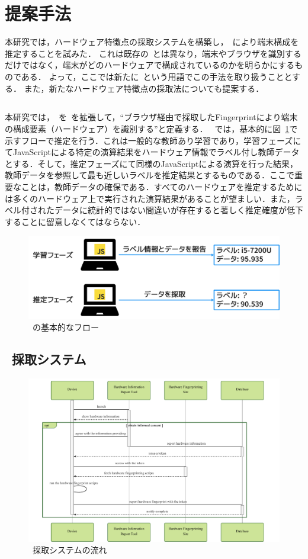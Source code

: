 \newpage
\section{提案手法}
本研究では，ハードウェア特徴点の採取システムを構築し，\fp~により端末構成を推定することを試みた．
これは既存の\fp~とは異なり，端末やブラウザを識別するだけではなく，端末がどのハードウェアで構成されているのかを明らかにするものである．
よって，ここでは新たに\hfp~という用語でこの手法を取り扱うこととする．
また，新たなハードウェア特徴点の採取法についても提案する．
\subsection{\hfp}
本研究では，\hfp~を\fp~を拡張して，``ブラウザ経由で採取したFingerprintにより端末の構成要素（ハードウェア）を識別する''と定義する．
\hfp~では，基本的に図~\ref{fig-hfp}で示すフローで推定を行う．これは一般的な教師あり学習であり，学習フェーズにてJavaScriptによる特定の演算結果をハードウェア情報でラベル付し教師データとする．そして，推定フェーズにて同様のJavaScriptによる演算を行った結果，教師データを参照して最も近しいラベルを推定結果とするものである．ここで重要なことは，教師データの確保である．すべてのハードウェアを推定するためには多くのハードウェア上で実行された演算結果があることが望ましい．また，ラベル付されたデータに統計的ではない間違いが存在すると著しく推定確度が低下することに留意しなくてはならない．
\begin{figure}[H]
	\centering
    \includegraphics[width=\textwidth,pagebox=artbox]{fig/hfp.png}
    \caption{\hfp~の基本的なフロー}
    \label{fig-hfp}
\end{figure}
\subsection{\hfp~採取システム}
\begin{figure}[H]
	\centering
    \includegraphics[width=\textwidth,pagebox=artbox]{fig/hero.pdf}
    \caption{\hfp~採取システムの流れ}
    \label{fig-hfp_system}
\end{figure}

